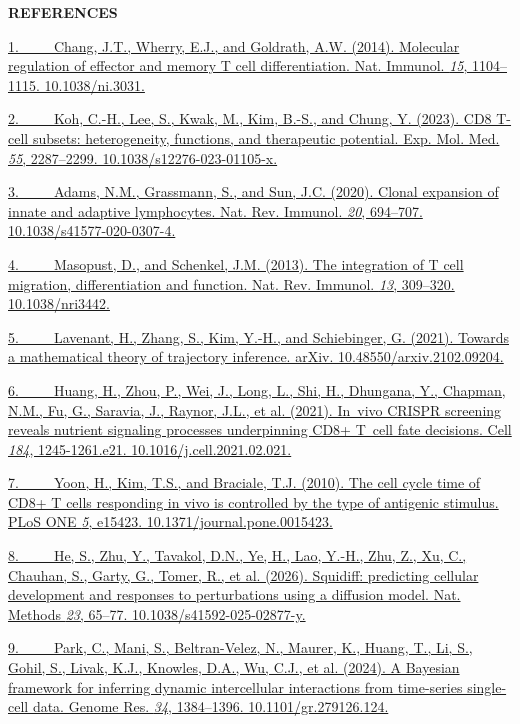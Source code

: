\textbf{REFERENCES}

\href{https://sciwheel.com/work/bibliography/1306567}{1.~   Chang, J.T.,
Wherry, E.J., and Goldrath, A.W. (2014). Molecular regulation of
effector and memory T cell differentiation. Nat. Immunol. \emph{15},
1104--1115. 10.1038/ni.3031.}

\href{https://sciwheel.com/work/bibliography/15592036}{2.~   Koh, C.-H.,
Lee, S., Kwak, M., Kim, B.-S., and Chung, Y. (2023). CD8 T-cell subsets:
heterogeneity, functions, and therapeutic potential. Exp. Mol. Med.
\emph{55}, 2287--2299. 10.1038/s12276-023-01105-x.}

\href{https://sciwheel.com/work/bibliography/8929852}{3.~   Adams, N.M.,
Grassmann, S., and Sun, J.C. (2020). Clonal expansion of innate and
adaptive lymphocytes. Nat. Rev. Immunol. \emph{20}, 694--707.
10.1038/s41577-020-0307-4.}

\href{https://sciwheel.com/work/bibliography/100389}{4.~   Masopust, D.,
and Schenkel, J.M. (2013). The integration of T cell migration,
differentiation and function. Nat. Rev. Immunol. \emph{13}, 309--320.
10.1038/nri3442.}

\href{https://sciwheel.com/work/bibliography/18537397}{5.~   Lavenant,
H., Zhang, S., Kim, Y.-H., and Schiebinger, G. (2021). Towards a
mathematical theory of trajectory inference. arXiv.
10.48550/arxiv.2102.09204.}

\href{https://sciwheel.com/work/bibliography/10552252}{6.~   Huang, H.,
Zhou, P., Wei, J., Long, L., Shi, H., Dhungana, Y., Chapman, N.M., Fu,
G., Saravia, J., Raynor, J.L., et al. (2021). In~vivo CRISPR screening
reveals nutrient signaling processes underpinning CD8+ T~cell fate
decisions. Cell \emph{184}, 1245-1261.e21. 10.1016/j.cell.2021.02.021.}

\href{https://sciwheel.com/work/bibliography/7598004}{7.~   Yoon, H.,
Kim, T.S., and Braciale, T.J. (2010). The cell cycle time of CD8+ T
cells responding in vivo is controlled by the type of antigenic
stimulus. PLoS ONE \emph{5}, e15423. 10.1371/journal.pone.0015423.}

\href{https://sciwheel.com/work/bibliography/18384638}{8.~   He, S.,
Zhu, Y., Tavakol, D.N., Ye, H., Lao, Y.-H., Zhu, Z., Xu, C., Chauhan,
S., Garty, G., Tomer, R., et al. (2026). Squidiff: predicting cellular
development and responses to perturbations using a diffusion model. Nat.
Methods \emph{23}, 65--77. 10.1038/s41592-025-02877-y.}

\href{https://sciwheel.com/work/bibliography/17494421}{9.~   Park, C.,
Mani, S., Beltran-Velez, N., Maurer, K., Huang, T., Li, S., Gohil, S.,
Livak, K.J., Knowles, D.A., Wu, C.J., et al. (2024). A Bayesian
framework for inferring dynamic intercellular interactions from
time-series single-cell data. Genome Res. \emph{34}, 1384--1396.
10.1101/gr.279126.124.}

